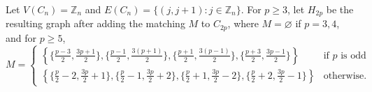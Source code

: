 \documentclass[12pt,a4paper]{article}
\begin{document}
Let $V(C_n)=\mathbb{Z}_n$ and $E(C_n)=\{(j,j+1):j\in\mathbb{Z}_n\}$. For $p\geq 3$, let $H_{2p}$ be the resulting graph after adding the matching $M$ to $C_{2p}$, where $M=\varnothing$ if $p=3,4$, and for $p\geq 5$, 
\begin{equation*}
M=\begin{cases}
    \left\{\{\frac{p-3}{2},\frac{3p+1}{2}\},\{\frac{p-1}{2},\frac{3(p+1)}{2}\},\{\frac{p+1}{2},\frac{3(p-1)}{2}\},\{\frac{p+3}{2},\frac{3p-1}{2}\}\right\} & \text{if $p$ is odd}\\
    \left\{\{\frac{p}{2}-2,\frac{3p}{2}+1\},\{\frac{p}{2}-1,\frac{3p}{2}+2\},\{\frac{p}{2}+1,\frac{3p}{2}-2\},\{\frac{p}{2}+2,\frac{3p}{2}-1\}\right\} & \text{otherwise.}
  \end{cases}
\end{equation*}
\end{document}
